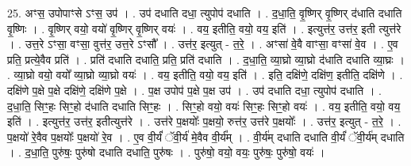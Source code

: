 \documentclass[17pt]{extarticle}
\begin{document}
25. अꣳस॒ उपोपाꣳसे ऽꣳस॒ उप॑ । . उप॑ दधाति दधा॒ त्युपोप॑ दधाति । . द॒धा॒ति॒ वृ॒ष्णिर् वृ॒ष्णिर् द॑धाति दधाति वृ॒ष्णिः । . वृ॒ष्णिर् वयो॒ वयो॑ वृ॒ष्णिर् वृ॒ष्णिर् वयः॑ । . वय॒ इतीति॒ वयो॒ वय॒ इति॑ । . इत्युत्त॑र॒ उत्त॑र॒ इती त्युत्त॑रे । . उत्त॒रे ऽꣳसा॒ वꣳसा॒ वुत्त॑र॒ उत्त॒रे ऽꣳसौ᳚ । . उत्त॑र॒ इत्युत् - त॒रे॒ । . अꣳसा॑ वे॒वै वाꣳसा॒ वꣳसा॑ वे॒व । . ए॒व प्रति॒ प्रत्ये॒वैव प्रति॑ । . प्रति॑ दधाति दधाति॒ प्रति॒ प्रति॑ दधाति । . द॒धा॒ति॒ व्या॒घ्रो व्या॒घ्रो द॑धाति दधाति व्या॒घ्रः । . व्या॒घ्रो वयो॒ वयो᳚ व्या॒घ्रो व्या॒घ्रो वयः॑ । . वय॒ इतीति॒ वयो॒ वय॒ इति॑ । . इति॒ दक्षि॑णे॒ दक्षि॑ण॒ इतीति॒ दक्षि॑णे । . दक्षि॑णे प॒क्षे प॒क्षे दक्षि॑णे॒ दक्षि॑णे प॒क्षे । . प॒क्ष उपोप॑ प॒क्षे प॒क्ष उप॑ । . उप॑ दधाति दधा॒ त्युपोप॑ दधाति । . द॒धा॒ति॒ सिꣳ॒॒हः सिꣳ॒॒हो द॑धाति दधाति सिꣳ॒॒हः । . सिꣳ॒॒हो वयो॒ वयः॑ सिꣳ॒॒हः सिꣳ॒॒हो वयः॑ । . वय॒ इतीति॒ वयो॒ वय॒ इति॑ । . इत्युत्त॑र॒ उत्त॑र॒ इतीत्युत्त॑रे । . उत्त॑रे प॒क्षयोः᳚ प॒क्षयो॒ रुत्त॑र॒ उत्त॑रे प॒क्षयोः᳚ । . उत्त॑र॒ इत्युत् - त॒रे॒ । . प॒क्षयो॑ रे॒वैव प॒क्षयोः᳚ प॒क्षयो॑ रे॒व । . ए॒व वी॒र्यं॑ ॅवी॒र्य॑ मे॒वैव वी॒र्य᳚म् । . वी॒र्य॑म् दधाति दधाति वी॒र्यं॑ ॅवी॒र्य॑म् दधाति । . द॒धा॒ति॒ पुरु॑षः॒ पुरु॑षो दधाति दधाति॒ पुरु॑षः । . पुरु॑षो॒ वयो॒ वयः॒ पुरु॑षः॒ पुरु॑षो॒ वयः॑ । \newline
\end{document}
